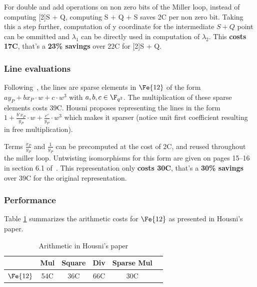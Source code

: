 For double and add operations on non zero bits of the Miller loop, instead of computing [2]S + Q, computing S + Q + S saves 2C per non zero bit.
Taking this a step further, computation of y coordinate for the intermediate $S + Q$ point can be ommitted and $\lambda_1$ can be directly used in computation of $\lambda_2$. This \textbf{costs 17C}, that's a \textbf{23\% savings} over 22C for [2]S + Q.

\subsubsection{Line evaluations}

Following~\cite{Ara13}, the lines are sparse elements in $\Fe{12}$ of the form $ay_P + bx_P \cdot w + c \cdot w^3$ with $a, b, c \in \F_{q^{2}}$. The multiplication of these sparse elements costs 39C.
Housni proposes representing the lines in the form $1 + \frac{b'x_P}{y_P} \cdot w + \frac{c'}{y_P} \cdot w^3$ which makes it sparser (notice unit first coefficient resulting in free multiplication).


Terms $\frac{x_P}{y_P}$ and $\frac{1}{y_P}$ can be precomputed at the cost of 2C, and reused throughout the miller loop. Untwisting isomorphisms for this form are given on pages 15–16 in section 6.1 of~\cite{ACNS:ElHousni23}.
This representation only \textbf{costs 30C}, that's a \textbf{30\% savings} over 39C for the original representation.

\subsubsection{Performance}

Table \ref{tab:fq12_pr1cs} summarizes the arithmetic costs for $\Fe{12}$ as presented in Housni's paper.

\begin{table}[h]
\centering
\caption{Arithmetic in Housni's paper\cite{ACNS:ElHousni23}}
\label{tab:fq12_pr1cs}
\begin{tabular}{|c|c|c|c|c|c|}
\hline
 & Mul & Square & Div & Sparse Mul \\
\hline
$\Fe{12}$ & 54C & 36C & 66C & 30C \\
\hline
\end{tabular}
\end{table}


